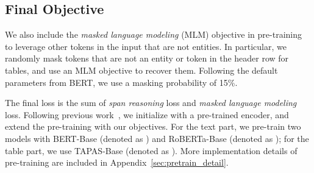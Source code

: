 \documentclass[11pt]{article}
\newcommand{\hs}[1]{\textcolor{blue}{Huan: #1}}
\newcommand{\nop}[1]{}
\newcommand{\ours}[0]{\text{ReasonBERT}}
\begin{document}
\nop{At inference time, \hs{may need to move this to exp section, because in exp, we talk about the extractive QA task..} we concatenate  and add special tokens to form the input sequence as , and then score all the start, end locations and rank all spans  by :}
\nop{should we move this paragraph to Section 5.1? so far the description is general and not involving extractive QA.}



\nop{
\subsection{Table Cell Selection}
To help the model learn to reason over tables, we also include a cell selection objective. In addition to predict the start and end location of the target entity, the model is taught to select the row and column by aggregating information from all cells in the that row or column. More specifically, we calculate the probability of target  belongs to row  as follows:

Here  is the weight matrix of row selection header, and the column selection probability is calculated similarly with another column selection header. We first score each cell by averaging over all tokens in that cell. We then do a max pooling over all cells in the row or column so the model can focus on the strongest signal, for example the column header. The \textit{cell selection} loss is then calculated as follows:

}

\subsection{Final Objective}
We also include the \textit{masked language modeling} (MLM) objective in pre-training to leverage other tokens in the input that are not entities. In particular, we randomly mask tokens that are not an entity or token in the header row for tables, and use an MLM objective to recover them. Following the default parameters from BERT, we use a masking probability of 15\%.

The final loss\nop{ for pre-training} is the sum of \textit{span reasoning} loss and \textit{masked language modeling} loss. {Following previous work~\cite{glass-etal-2020-span, herzig-etal-2020-tapas}, we initialize with a pre-trained encoder, and extend the pre-training with our objectives. For the text part, we pre-train two models with BERT-Base (denoted as \ours{\scriptsize{B}}) and RoBERTa-Base (denoted as \ours{\scriptsize{R}}); for the table part, we use TAPAS-Base (denoted as \ours{\scriptsize{T}}).} More implementation details of pre-training are included in Appendix~\ref{sec:pretrain_detail}.
\end{document}
